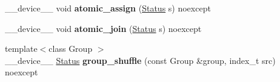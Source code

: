 \begin{DoxyCompactItemize}
\+\_\+\+\_\+device\+\_\+\+\_\+ void {\bfseries atomic\+\_\+assign} (\hyperlink{classwarpcore_1_1Status}{Status} s) noexcept
\item 
\mbox{\label{classwarpcore_1_1Status_a30340aaa237bc68fa8ab08d1ac4a3edb}} 
\+\_\+\+\_\+device\+\_\+\+\_\+ void {\bfseries atomic\+\_\+join} (\hyperlink{classwarpcore_1_1Status}{Status} s) noexcept
\item 
\mbox{\label{classwarpcore_1_1Status_a9b603136ac0c25c0d1ad948f3fae5658}} 
{\footnotesize template$<$class Group $>$ }\\\+\_\+\+\_\+device\+\_\+\+\_\+ \hyperlink{classwarpcore_1_1Status}{Status} {\bfseries group\+\_\+shuffle} (const Group \&group, index\+\_\+t src) noexcept
\end{DoxyCompactItemize}
